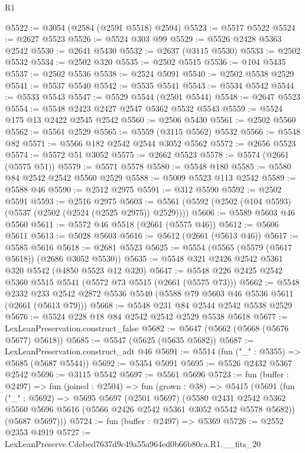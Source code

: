 \begin{lexlean}{R1}
\begin{coremodule}
@5522 := @3054 (@2584 (@2591 @5518) @2594)
@5523 := @5517 @5522
@5524 := @2627 @5523
@5526 := @5524 @303 @99
@5529 := @5526 @2428 @5363 @2542
@5530 := @2641 @5430
@5532 := @2637 (@3115 @5530)
@5533 := @2502 @5532
@5534 := @2502 @320
@5535 := @2502 @5515
@5536 := @104 @5435
@5537 := @2502 @5536
@5538 := @2524 @5091
@5540 := @2502 @5538 @2529
@5541 := @5537 @5540
@5542 := @5535 @5541
@5543 := @5534 @5542
@5544 := @5533 @5543
@5547 := @5529 @5544 (@2501 @5544)
@5548 := @2647 @5523
@5554 := @5548 @2423 @2427 @2547 @5362 @5532 @5543
@5559 := @5524 @175 @13 @2422 @2545 @2542
@5560 := @2506 @5430
@5561 := @2502 @5560
@5562 := @5561 @2529
@5565 := @5559 (@3115 @5562) @5532
@5566 := @5548 @82
@5571 := @5566 @182 @2542 @2544 @3052 @5562
@5572 := @2656 @5523
@5574 := @5572 @51 @3052
@5575 := @2662 @5523
@5578 := @5574 (@2661 (@5575 @51))
@5579 := @5571 @5578
@5580 := @5548 @180
@5585 := @5580 @84 @2542 @2542 @5560 @2529
@5588 := @5009 @5523 @113 @2542
@5589 := @5588 @46
@5590 := @2512 @2975
@5591 := @312 @5590
@5592 := @2502 @5591
@5593 := @2516 @2975
@5603 := @5561 (@5592 (@2502 (@104 @5593) (@5537 (@2502 (@2524 (@2525 @2975)) @2529))))
@5606 := @5589 @5603 @46 @5560
@5611 := @5572 @46 @5518 (@2661 (@5575 @46))
@5612 := @5606 @5611
@5613 := @5028 @5603
@5616 := @5612 (@2661 (@5613 @46))
@5617 := @5585 @5616
@5618 := @2681 @5523
@5625 := @5554 (@5565 (@5579 (@5617 @5618)) (@2686 @3052 @5530))
@5635 := @5548 @321 @2426 @2542 @5361 @320 @5542 (@4850 @5523 @12 @320)
@5647 := @5548 @226 @2425 @2542 @5360 @5515 @5541 (@5572 @73 @5515 (@2661 (@5575 @73)))
@5662 := @5548
    @2332
    @233
    @2542
    @2872
    @5536
    @5540
    (@5588 @79 @5603 @46 @5536 @5611 (@2661 (@5613 @79)))
@5668 := @5548 @231 @84 @2544 @2542 @5538 @2529
@5676 := @5524 @228 @18 @84 @2542 @2542 @2529 @5538 @5618
@5677 := LexLeanPreservation.construct_false
@5682 := @5647 (@5662 (@5668 (@5676 @5677) @5618))
@5685 := @5547 (@5625 (@5635 @5682))
@5687 := LexLeanPreservation.construct_adt @46
@5691 := @5514 (fun ("_" : @5355) => @5685 (@5687 @5544))
@5692 := @5354 @5091
@5695 := @5526 @2432 @5367 @2542
@5696 := @3115 @5542
@5697 := @5561 @5696
@5723 := fun (buffer : @2497) =>
  fun (joined : @2504) =>
  fun (grown : @38) =>
  @5415
    (@5691
      (fun ("_" : @5692) =>
      @5695
        @5697
        (@2501 @5697)
        (@5580
          @2431
          @2542
          @5362
          @5560
          @5696
          @5616
          (@5566 @2426 @2542 @5361 @3052 @5542 @5578 @5682))
        (@5687 @5697)))
@5724 := fun (buffer : @2497) => @5369
@5726 := @2552 @2353 @4919
@5727 := LexLeanPreserve.Cdebed7637d9c49a55a964ed0b66b80ca.R1.__fits_20

\end{coremodule}
\end{lexlean}
